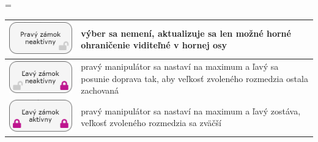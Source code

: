 \documentclass[
  digital, %
  twoside, %
  notable,   %
  nolof,   %
  nolot,   %
]{fithesis3}
\begin{document}
\begin{center}
\tabulinesep=\tabcolsep
  \begin{tabu}{ X[2,c,m] | X[7,c,m] }
    \includegraphics[width=1\linewidth]{right_unlock} & výber sa nemení, aktualizuje sa len možné horné ohraničenie viditeľné v hornej osy \\ \hline
    \includegraphics[width=1\linewidth]{left_unlock} & pravý manipulátor sa nastaví na maximum a ľavý sa posunie doprava tak, aby veľkosť zvoleného rozmedzia ostala zachovaná \\ \hline
    \includegraphics[width=1\linewidth]{left_lock} & pravý manipulátor sa nastaví na maximum a ľavý zostáva, veľkosť zvoleného rozmedzia sa zväčší \ \
  \end{tabu}
\end{center}
\end{document}
